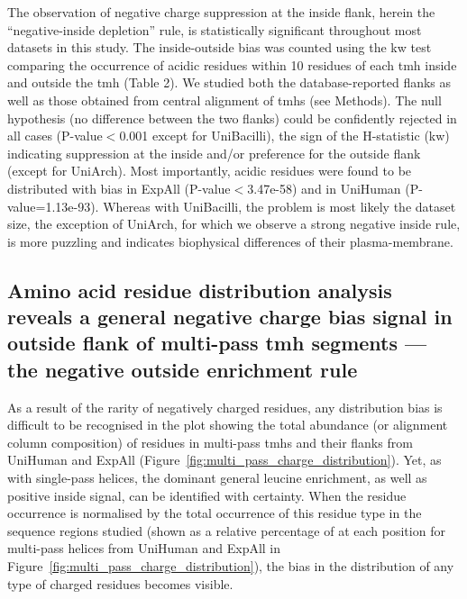 The observation of negative charge suppression at the inside flank, herein the “negative-inside depletion” rule, is statistically significant throughout most datasets in this study. The inside-outside bias was counted using the \gls{kw} test comparing the occurrence of acidic residues within 10 residues of each \gls{tmh} inside and outside the \gls{tmh} (Table 2). We studied both the database-reported flanks as well as those obtained from central alignment of \gls{tmh}s (see Methods). The null hypothesis (no difference between the two flanks) could be confidently rejected in all cases (P-value$<$0.001 except for UniBacilli), the sign of the H-statistic (\gls{kw}) indicating suppression at the inside and/or preference for the outside flank (except for UniArch). Most importantly, acidic residues were found to be distributed with bias in ExpAll (P-value$<$3.47e-58) and in UniHuman (P-value=1.13e-93). Whereas with UniBacilli, the problem is most likely the dataset size, the exception of UniArch, for which we observe a strong negative inside rule, is more puzzling and indicates biophysical differences of their plasma-membrane.

\subsection{Amino acid residue distribution analysis reveals a general negative charge bias signal in outside flank of multi-pass \gls{tmh} segments --- the negative outside enrichment rule}

As a result of the rarity of negatively charged residues, any distribution bias is difficult to be recognised in the plot showing the total abundance (or alignment column composition) of residues in multi-pass \gls{tmh}s and their flanks from UniHuman and ExpAll (Figure~\ref{fig:multi_pass_charge_distribution}). Yet, as with single-pass helices, the dominant general leucine enrichment, as well as positive inside signal, can be identified with certainty. When the residue occurrence is normalised by the total occurrence of this residue type in the sequence regions studied (shown as a relative percentage of at each position for multi-pass helices from UniHuman and ExpAll  in Figure~\ref{fig:multi_pass_charge_distribution}), the bias in the distribution of any type of charged residues becomes visible.

